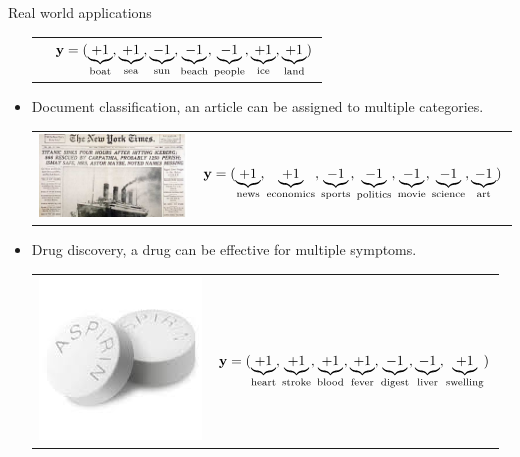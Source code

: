 \documentclass[first=dgreen,second=purple,logo=yellowexc]{aaltoslides}
\begin{document}
\begin{frame}{Real world applications}
\begin{itemize}
\begin{tabular}{p{3cm}p{10cm}}
		& $\mathbf {y}=(\underbrace{+1}_{\text{boat}},\underbrace{+1}_{\text{sea}},\underbrace{-1}_{\text{sun}},\underbrace{-1}_{\text{beach}},\underbrace{-1}_{\text{people}},\underbrace{+1}_{\text{ice}},\underbrace{+1}_{\text{land}})$\\
        \end{tabular}
		\item Document classification, an article can be assigned to multiple categories.
		\begin{tabular}{p{3cm}p{10cm}} 
        \multirow{2}{*}{\includegraphics[scale = 0.11]{./figures/titanic.jpg}} & \\
		& $\mathbf {y}=(\underbrace{+1}_{\text{news}},\underbrace{+1}_{\text{economics}},\underbrace{-1}_{\text{sports}},\underbrace{-1}_{\text{politics}},\underbrace{-1}_{\text{movie}},\underbrace{-1}_{\text{science}},\underbrace{-1}_{\text{art}})$\\
        \end{tabular}
		\item Drug discovery, a drug can be effective for multiple symptoms.
		\begin{tabular}{p{3cm}p{10cm}} 
        \multirow{2}{*}{\includegraphics[scale = 0.25]{./figures/aspirin.jpg}} & \\
		& $\mathbf {y}=(\underbrace{+1}_{\text{heart}},\underbrace{+1}_{\text{stroke}},\underbrace{+1}_{\text{blood}},\underbrace{+1}_{\text{fever}},\underbrace{-1}_{\text{digest}},\underbrace{-1}_{\text{liver}},\underbrace{+1}_{\text{swelling}})$\\
        \end{tabular}
	\end{itemize}
\end{frame}
\end{document}
